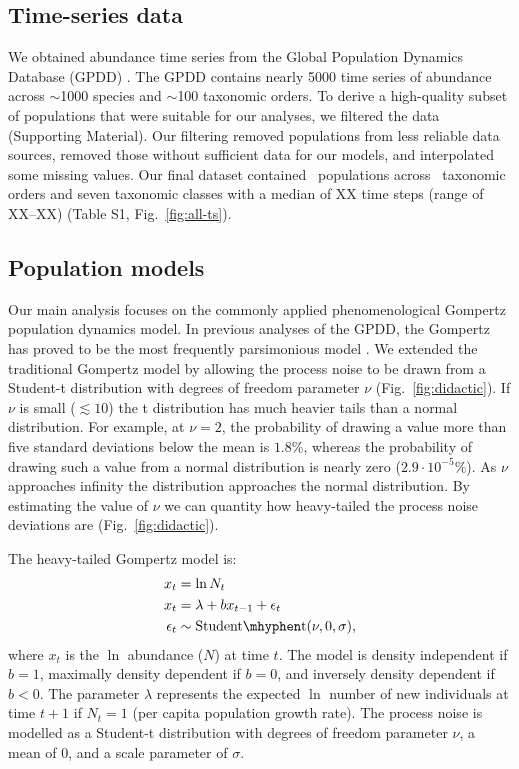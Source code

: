 \subsection{Time-series data}

We obtained abundance time series from the Global Population Dynamics Database (GPDD) \citep{gpdd2010}. The GPDD contains nearly 5000 time series of abundance across $\sim$1000 species and $\sim$100 taxonomic orders. To derive a high-quality subset of populations that were suitable for our analyses, we filtered the data (Supporting Material). Our filtering removed populations from less reliable data sources, removed those without sufficient data for our models, and interpolated some missing values. Our final dataset contained \NPops~populations across \NOrders~taxonomic orders and seven taxonomic classes with a median of XX time steps (range of XX--XX) (Table S1, Fig.~\ref{fig:all-ts}).

\subsection{Population models}

Our main analysis focuses on the commonly applied phenomenological Gompertz population dynamics model. In previous analyses of the GPDD, the Gompertz has proved to be the most frequently parsimonious model \citep{brook2006}. We extended the traditional Gompertz model by allowing the process noise to be drawn from a Student-t distribution with degrees of freedom parameter $\nu$ (Fig.~\ref{fig:didactic}). If $\nu$ is small ($\lesssim 10$) the t distribution has much heavier tails than a normal distribution. For example, at $\nu = 2$, the probability of drawing a value more than five standard deviations below the mean is $1.8$\%, whereas the probability of drawing such a value from a normal distribution is nearly zero ($2.9\cdot10^{-5}$\%). As $\nu$ approaches infinity the distribution approaches the normal distribution. By estimating the value of $\nu$ we can quantity how heavy-tailed the process noise deviations are (Fig.~\ref{fig:didactic}).

The heavy-tailed Gompertz model is: 
\begin{align*}
x_t &= \ln N_t\\
x_t &= \lambda + b x_{t-1} + \epsilon_t\\
\epsilon_t &\sim \mathrm{Student\mhyphen t}(\nu, 0, \sigma),
\end{align*}
where $x_t$ is the $\ln$ abundance ($N$) at time $t$. The model is density independent if $b = 1$, maximally density dependent if $b = 0$, and inversely density dependent if $b < 0$. The parameter $\lambda$ represents the expected $\ln$ number of new individuals at time $t + 1$ if $N_t = 1$ (per capita population growth rate). The process noise is modelled as a Student-t distribution with degrees of freedom parameter $\nu$, a mean of $0$, and a scale parameter of $\sigma$.

